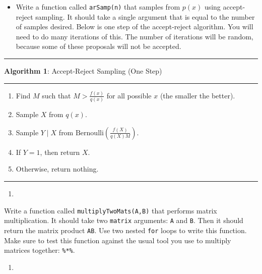 \documentclass[
  12pt,
  krantz2]{krantz}
\providecommand{\tightlist}{%
  \setlength{\itemsep}{0pt}\setlength{\parskip}{0pt}}
\begin{document}
\begin{itemize}
\tightlist
\item
  Write a function called \texttt{arSamp(n)} that samples from \(p(x)\) using accept-reject sampling. It should take a single argument that is equal to the number of samples desired. Below is one step of the accept-reject algorithm. You will need to do many iterations of this. The number of iterations will be random, because some of these proposals will not be accepted.
\end{itemize}

\begin{center}\rule{0.5\linewidth}{0.5pt}\end{center}

\textbf{Algorithm 1}: Accept-Reject Sampling (One Step)

\begin{center}\rule{0.5\linewidth}{0.5pt}\end{center}

\begin{enumerate}
\def\labelenumi{\arabic{enumi}.}
\tightlist
\item
  Find \(M\) such that \(M > \frac{f(x)}{q(x)}\) for all possible \(x\) (the smaller the better).
\item
  Sample \(X\) from \(q(x)\).
\item
  Sample \(Y \mid X\) from \(\text{Bernoulli}\left(\frac{f(X)}{q(X)M}\right)\).
\item
  If \(Y = 1\), then return \(X\).
\item
  Otherwise, return nothing.
\end{enumerate}

\begin{center}\rule{0.5\linewidth}{0.5pt}\end{center}

\begin{enumerate}
\def\labelenumi{\arabic{enumi}.}
\setcounter{enumi}{2}
\tightlist
\item
\end{enumerate}

Write a function called \texttt{multiplyTwoMats(A,B)} that performs matrix multiplication. It should take two \texttt{matrix} arguments: \texttt{A} and \texttt{B}. Then it should return the matrix product \texttt{AB}. Use two nested \texttt{for} loops to write this function. Make sure to test this function against the usual tool you use to multiply matrices together: \texttt{\%*\%}.

\begin{enumerate}
\def\labelenumi{\arabic{enumi}.}
\setcounter{enumi}{3}
\tightlist
\item
\end{enumerate}
\end{document}
